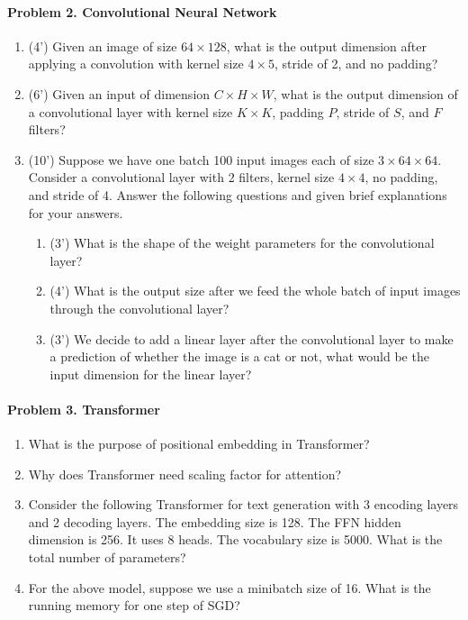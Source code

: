\documentclass[11pt]{article}\pagestyle{plain}
\begin{document}
\paragraph{Problem 2. Convolutional Neural Network}
\begin{enumerate}
	\item (4') Given an image of size $64\times128$, what is the output dimension after applying a convolution with kernel size $4\times 5$, stride of 2, and no padding?
	
	\item (6') Given an input of dimension $C\times H\times W$, what is the output dimension of a convolutional layer with kernel size $K\times K$, padding $P$, stride of $S$, and $F$ filters?
	
	\item (10') Suppose we have one batch 100 input images each of size $3\times 64\times 64$. Consider a convolutional layer with 2 filters, kernel size $4\times 4$, no padding, and stride of 4. Answer the following questions and given brief explanations for your answers.
	
	\begin{enumerate}
		\item (3') What is the shape of the weight parameters for the convolutional layer?
		\item (4') What is the output size after we feed the whole batch of input images through the convolutional layer?
		\item (3') We decide to add a linear layer after the convolutional layer to make a prediction of whether the image is a cat or not, what would be the input dimension for the linear layer?
	\end{enumerate}
\end{enumerate}


\paragraph{Problem 3. Transformer}
\begin{enumerate}
	\item What is the purpose of positional embedding in Transformer?
	\item Why does Transformer need scaling factor for attention?
	\item Consider the following Transformer for text generation with 3 encoding layers and 2 decoding layers. The embedding size is 128. The FFN hidden dimension is 256. It uses 8 heads. The vocabulary size is 5000. What is the total number of parameters? 
	\item For the above model, suppose we use a minibatch size of 16. What is the running memory for one step of SGD?
\end{enumerate}
\end{document}
